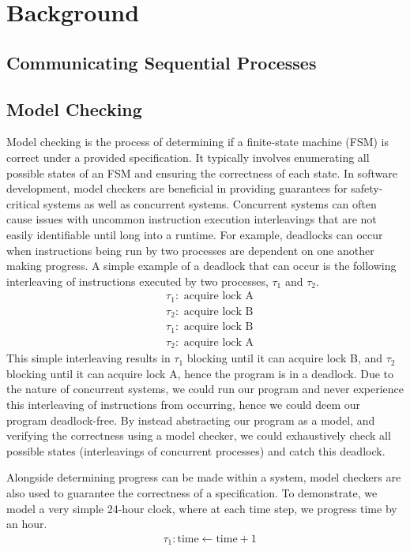 \chapter{Background}
\section[]{Communicating Sequential Processes}
\section[]{Model Checking}
Model checking is the process of determining if a finite-state machine (FSM) is correct under a provided specification. It typically involves enumerating all possible states of an FSM and ensuring the correctness of each state. In software development, model checkers are beneficial in providing guarantees for safety-critical systems as well as concurrent systems. Concurrent systems can often cause issues with uncommon instruction execution interleavings that are not easily identifiable until long into a runtime. For example, deadlocks can occur when instructions being run by two processes are dependent on one another making progress. A simple example of a deadlock that can occur is the following interleaving of instructions executed by two processes, $\tau_1$ and $\tau_2$. 
\[
\begin{aligned}
& \tau_1: \text{ acquire lock A} \\
& \tau_2: \text{ acquire lock B} \\
& \tau_1: \text{ acquire lock B} \\
& \tau_2: \text{ acquire lock A}
\end{aligned}
\]
This simple interleaving results in $\tau_1$ blocking until it can acquire lock B, and $\tau_2$ blocking until it can acquire lock A, hence the program is in a deadlock. Due to the nature of concurrent systems, we could run our program and never experience this interleaving of instructions from occurring, hence we could deem our program deadlock-free. By instead abstracting our program as a model, and verifying the correctness using a model checker, we could exhaustively check all possible states (interleavings of concurrent processes) and catch this deadlock. 
\par
Alongside determining progress can be made within a system, model checkers are also used to guarantee the correctness of a specification. To demonstrate, we model a very simple 24-hour clock, where at each time step, we progress time by an hour.
\[
\begin{aligned}
& \tau_1: \text{time} \leftarrow \text{time} + 1
\end{aligned}
\]

